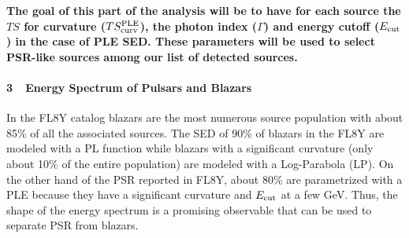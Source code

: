 \documentclass[12pt,twoside,letterpaper,onecolumn,english]{article}
\begin{document}
{\bf The goal of this part of the analysis will be to have for each source the $TS$ for curvature ($TS^{\rm{PLE}}_{\rm{curv}}$), the photon index ($\Gamma$) and energy cutoff ($E_{\rm{cut}}$) in the case of PLE SED. These parameters will be used to select PSR-like sources among our list of detected sources.}




\paragraph{3\ \ Energy Spectrum of Pulsars and Blazars}
\label{sec:analysis}
In the FL8Y catalog blazars are the most numerous source
population with about 85\% of all the associated sources.
The SED of 90\% of blazars in the FL8Y are modeled with a PL function 
while blazars with a significant curvature (only about 10\% of the
entire population) are modeled with a Log-Parabola (LP).
On the other hand of the PSR reported in FL8Y, about 80\% are
parametrized with a PLE because
they have a significant curvature and $E_{\rm{cut}}$ at a few GeV.
Thus, the shape of the energy spectrum is a promising observable that can be used to
separate PSR from blazars.
\end{document}
